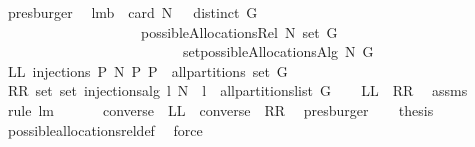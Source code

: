 \begin{isabellebody}
\ presburger\ \isanewline
{}\isamarkupfalse%
%
\endisatagproof
{\isafoldproof}%
%
\isadelimproof
\isanewline
%
\endisadelimproof
\isanewline
\isanewline
{}\isamarkupfalse%
\ lm{}{}b{\isacharcolon}\ \ {\isachardoublequoteopen}card\ N\ {\isachargreater}\ {}{\isachardoublequoteclose}\ {\isachardoublequoteopen}distinct\ G{\isachardoublequoteclose}\ \isanewline
\ \ \ \ \ \ \ \ \ \ \ \ \ \ \ \ \ \ \ \ {\isachardoublequoteopen}possibleAllocationsRel\ N\ {\isacharparenleft}set\ G{\isacharparenright}\ {\isacharequal}\ \isanewline
\ \ \ \ \ \ \ \ \ \ \ \ \ \ \ \ \ \ \ \ \ \ \ \ \ \ set{\isacharparenleft}possibleAllocationsAlg\ N\ G{\isacharparenright}{\isachardoublequoteclose}\ \isanewline
%
\isadelimproof
%
\endisadelimproof
%
\isatagproof
{}\isamarkupfalse%
\ {\isacharminus}\isanewline
\ \ \isamarkupfalse%
\ {\isacharquery}LL{\isacharequal}{\isachardoublequoteopen}{\isasymUnion}\ {\isacharbraceleft}injections\ P\ N{\isacharbar}\ P{\isachardot}\ P\ {\isasymin}\ all{\isacharunderscore}partitions\ {\isacharparenleft}set\ G{\isacharparenright}{\isacharbraceright}{\isachardoublequoteclose}\isanewline
\ \ \isamarkupfalse%
\ {\isacharquery}RR{\isacharequal}{\isachardoublequoteopen}{\isasymUnion}\ {\isacharparenleft}set\ {\isacharbrackleft}set\ {\isacharparenleft}injections{\isacharunderscore}alg\ l\ N{\isacharparenright}\ {\isachardot}\ l\ {\isasymleftarrow}\ all{\isacharunderscore}partitions{\isacharunderscore}list\ G{\isacharbrackright}{\isacharparenright}{\isachardoublequoteclose}\isanewline
\ \ \isamarkupfalse%
\ {\isachardoublequoteopen}{\isacharquery}LL\ {\isacharequal}\ {\isacharquery}RR{\isachardoublequoteclose}\ \isamarkupfalse%
\ assms\ \isamarkupfalse%
\ {\isacharparenleft}rule\ lm{}{}{\isacharparenright}\ \isamarkupfalse%
\isanewline
\ \ \isamarkupfalse%
\ \isamarkupfalse%
\ {\isachardoublequoteopen}converse\ {\isacharbackquote}\ {\isacharquery}LL\ {\isacharequal}\ converse\ {\isacharbackquote}\ {\isacharquery}RR{\isachardoublequoteclose}\ \isamarkupfalse%
\ presburger\isanewline
\ \ \isamarkupfalse%
\ {\isacharquery}thesis\ \isamarkupfalse%
\ possible{\isacharunderscore}allocations{\isacharunderscore}rel{\isacharunderscore}def\ \isamarkupfalse%
\ force\isanewline
{}\isamarkupfalse%
%
\endisatagproof
{\isafoldproof}%
%
\isadelimproof
\isanewline
%
\endisadelimproof
%
\isadelimtheory
\isanewline
%
\endisadelimtheory
%
\isatagtheory
{}\isamarkupfalse%
%
\endisatagtheory
{\isafoldtheory}%
%
\isadelimtheory
%
\endisadelimtheory
\end{isabellebody}%
